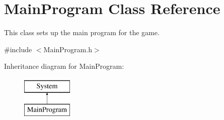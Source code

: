 \hypertarget{class_main_program}{}\section{Main\+Program Class Reference}
\label{class_main_program}


This class sets up the main program for the game.  




{\ttfamily \#include $<$Main\+Program.\+h$>$}

Inheritance diagram for Main\+Program\+:\begin{figure}[H]
\begin{center}
\leavevmode
\includegraphics[height=2.000000cm]{class_main_program}
\end{center}
\end{figure}
